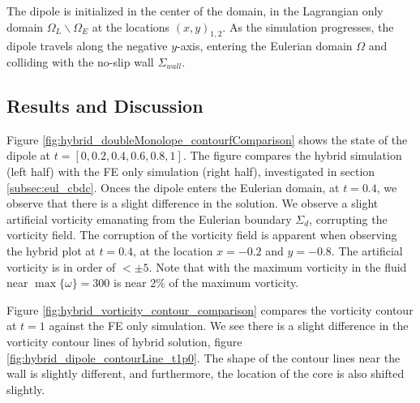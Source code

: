 The dipole is initialized in the center of the domain, in the Lagrangian only domain $\Omega_L\backslash\Omega_E$ at the locations $(x,y)_{1,2}$. As the simulation progresses, the dipole travels along the negative $y$-axis, entering the Eulerian domain $\Omega$ and colliding with the no-slip wall $\Sigma_{wall}$.

\subsection{Results and Discussion}

Figure \ref{fig:hybrid_doubleMonolope_contourfComparison} shows the state of the dipole at $t=[0,0.2,0.4,0.6,0.8,1]$. The figure compares the hybrid simulation (left half) with the FE only simulation (right half), investigated in section \ref{subsec:eul_cbdc}. Onces the dipole enters the Eulerian domain, at $t=0.4$, we observe that there is a slight difference in the solution. We observe a slight artificial vorticity emanating from the Eulerian boundary $\Sigma_d$, corrupting the vorticity field. The corruption of the vorticity field is apparent when observing the hybrid plot at $t=0.4$, at the location $x=-0.2$ and $y=-0.8$. The artificial vorticity is in order of $<\pm5$. Note that with the maximum vorticity in the fluid near $\max\{\omega\}=300$ is near $2\%$ of the maximum vorticity.

Figure \ref{fig:hybrid_vorticity_contour_comparison} compares the vorticity contour at $t=1$ against the FE only simulation. We see there is a slight difference in the vorticity contour lines of hybrid solution, figure \ref{fig:hybrid_dipole_contourLine_t1p0}. The shape of the contour lines near the wall is slightly different, and furthermore, the location of the core is also shifted slightly.

